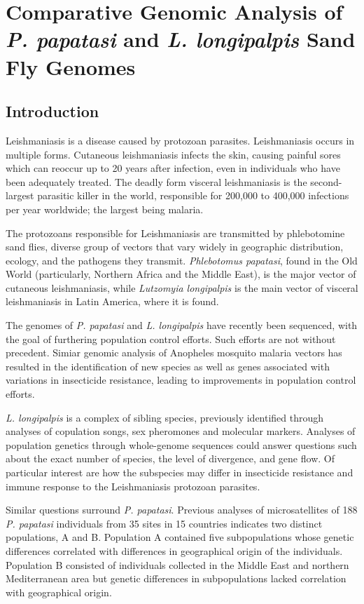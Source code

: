 \chapter{Comparative Genomic Analysis of \emph{P. papatasi} and \emph{L. longipalpis} Sand Fly Genomes}

\section{Introduction}
Leishmaniasis is a disease caused by protozoan parasites. Leishmaniasis occurs in multiple forms. Cutaneous leishmaniasis infects the skin, causing painful sores which can reoccur up to 20 years after infection, even in individuals who have been adequately treated. The deadly form visceral leishmaniasis is the second-largest parasitic killer in the world, responsible for 200,000 to 400,000 infections per year worldwide; the largest being malaria.

The protozoans responsible for Leishmaniasis are transmitted by phlebotomine sand flies, diverse group of vectors that vary widely in geographic distribution, ecology, and the pathogens they transmit. \emph{Phlebotomus papatasi}, found in the Old World (particularly, Northern Africa and the Middle East), is the major vector of cutaneous leishmaniasis, while \emph{Lutzomyia longipalpis} is the main vector of visceral leishmaniasis in Latin America, where it is found.

The genomes of \emph{P. papatasi} and \emph{L. longipalpis} have recently been sequenced, with the goal of furthering population control efforts. Such efforts are not without precedent. Simiar genomic analysis of Anopheles mosquito malaria vectors has resulted in the identification of new species as well as genes associated with variations in insecticide resistance, leading to improvements in  population control efforts.

\emph{L. longipalpis} is a complex of sibling species, previously identified through analyses of copulation songs, sex pheromones and molecular markers.  Analyses of population genetics through whole-genome sequences could answer questions such about the exact number of species, the level of divergence, and gene flow.  Of particular interest are how the subspecies may differ in insecticide resistance and immune response to the Leishmaniasis protozoan parasites.

Similar questions surround \emph{P. papatasi}.  Previous analyses of microsatellites of 188 \emph{P. papatasi} individuals from 35 sites in 15 countries indicates two distinct populations, A and B.  Population A contained five subpopulations whose genetic differences correlated with differences in geographical origin of the individuals.  Population B consisted of individuals collected in the Middle East and northern Mediterranean area but genetic differences in subpopulations lacked correlation with geographical origin.

